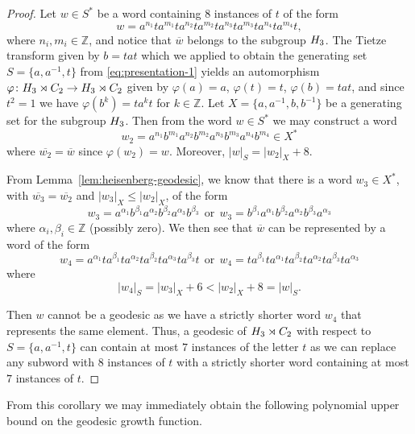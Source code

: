 \begin{proof}
	Let $w \in S^*$ be a word containing $8$ instances of $t$ of the form
	\[
	w
	=
	a^{n_1} t 
	a^{m_1} t
	a^{n_2} t 
	a^{m_2} t
	a^{n_3} t 
	a^{m_3} t
	a^{n_4} t 
	a^{m_4} t,
	\] where $n_i,m_i\in \mathbb Z$, 
	and notice that $\overline{w}$ belongs to the subgroup $H_3$.
	The Tietze transform given by $b = tat$ which we applied to obtain the generating set $S = \{a,a^{-1},t\}$ from \eqref{eq:presentation-1} yields an automorphism $\varphi \colon H_3 \rtimes C_2 \to H_3 \rtimes C_2$ given by $\varphi(a) = a$, $\varphi(t) = t$, $\varphi(b) = tat$, and since 
	$t^2 = 1$ 
	we have $\varphi(b^k) = ta^kt$ for  $k \in \mathbb{Z}$.
	Let $X = \{a,a^{-1},b,b^{-1}\}$ be a generating set for the subgroup $H_3$.
	Then from the word $w \in S^*$ we may construct a word 
	\[
	w_2
	=
	a^{n_1}
	b^{m_1}
	a^{n_2}
	b^{m_2}
	a^{n_3}
	b^{m_3}
	a^{n_4}
	b^{m_4}\in X^*
	\]
	where $\overline{w_2} = \overline{w}$ since $\varphi(w_2) = w$.
	Moreover, $|w|_S = |w_2|_X + 8$.
	
	From Lemma~\ref{lem:heisenberg-geodesic}, we know that there is a word $w_3 \in X^*$, with  $\overline{w_3}=\overline{w_2}$ and $|w_3|_X \leq |w_2|_X$, of the form
	\[
	w_3
	=
	a^{\alpha_1}
	b^{\beta_1}
	a^{\alpha_2}
	b^{\beta_2}
	a^{\alpha_3}
	b^{\beta_3}
	\ \ \text{or}\ \ 
	w_3
	=
	b^{\beta_1}
	a^{\alpha_1}
	b^{\beta_2}
	a^{\alpha_2}
	b^{\beta_3}
	a^{\alpha_3}
	\] where $\alpha_i,\beta_i\in\mathbb Z$ (possibly zero).
	We then see that $\overline{w}$ can be represented by a word of the form
	\[
	w_4
	=
	a^{\alpha_1} t
	a^{\beta_1} t
	a^{\alpha_2} t
	a^{\beta_2} t
	a^{\alpha_3} t
	a^{\beta_3} t
	\ \ \text{or}\ \ 
	w_4
	=
	t
	a^{\beta_1} t
	a^{\alpha_1} t
	a^{\beta_2} t
	a^{\alpha_2} t
	a^{\beta_3} t
	a^{\alpha_3}
	\]
	where \[|w_4|_S = |w_3|_X + 6 < |w_2|_X + 8 = |w|_S.\]
	
	Then $w$ cannot be a geodesic as we have a strictly shorter word $w_4$ that represents the same element.
	Thus, a geodesic of $H_3 \rtimes C_2$ with respect to $S = \{a,a^{-1},t\}$ can contain at most $7$ instances of the letter $t$ as we can replace any subword with $8$ instances of $t$ with a strictly shorter word containing at most $7$ instances of $t$.
\end{proof}

From this corollary we may immediately obtain the following polynomial upper bound on the geodesic growth function.

\setcounter{theoremx}{1}
\TheoremVirtuallyHeisenberg

